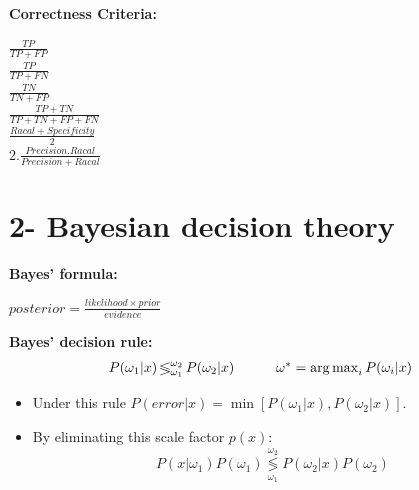 \documentclass{../cheat}
\begin{document}
\begin{multicols}{3}
		\textbf{Correctness Criteria:}
		
		$\frac{TP}{TP+FP}$ \\
		 	 $\frac{TP}{TP+FN}$\\
		 $\frac{TN}{TN+FP}$ \\
		 $\frac{TP+TN}{TP+TN+FP+FN}$\\
		 $\frac{Racal+Specificity}{2}$\\
		 $2.\frac{Precision.Racal}{Precision+Racal}$
		
	
	
	\section{2- Bayesian decision theory}	
	\textbf{Bayes' formula:}

		$posterior = \frac{likelihood \times prior}{evidence}$
	
	\textbf{Bayes' decision rule:}
	\[ \begin{array}{cc}
		P(\omega_1|x) \operatorname*{\lessgtr}_{\omega_1}^{\omega_2} P(\omega_2|x) \quad \null & \null \quad
		\omega^* = \operatorname*{arg\,max}_{i} P(\omega_i|x)
	\end{array}\]
	\begin{itemize}[nolistsep, leftmargin=1em]
		\item Under this rule $P(error|x) = \min [P(\omega_1|x), P(\omega_2|x)]$.
		\item By eliminating this scale factor $p(x)$: 
		\[P(x|\omega_1) P(\omega_1) \operatorname*{\lessgtr}_{\omega_1}^{\omega_2} P(\omega_2|x) P(\omega_2)\]
	\end{itemize}
	

\end{multicols}
\end{document}
